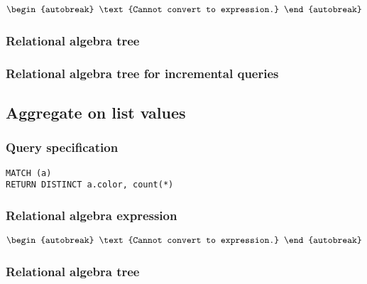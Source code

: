 \begin{align*}
\begin{autobreak}
\text{Cannot convert to expression.}
\end{autobreak}
\end{align*}

\subsubsection*{Relational algebra tree}


\subsubsection*{Relational algebra tree for incremental queries}


\subsection{Aggregate on list values}

\subsubsection*{Query specification}

\begin{lstlisting}
MATCH (a)
RETURN DISTINCT a.color, count(*)
\end{lstlisting}

\subsubsection*{Relational algebra expression}

\begin{align*}
\begin{autobreak}
\text{Cannot convert to expression.}
\end{autobreak}
\end{align*}

\subsubsection*{Relational algebra tree}


